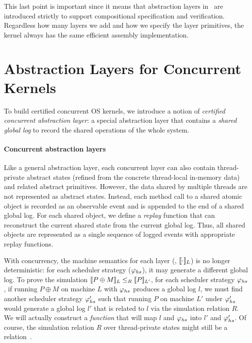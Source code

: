 This last point is important since it means that abstraction
layers in \CTOS\ are introduced strictly to support compositional 
specification and verification. Regardless how many layers we add 
and how we specify the layer primitives, the kernel always has the same 
efficient assembly implementation.

\section{Abstraction Layers for Concurrent Kernels}
\label{sec:overview:concurrent}
To build certified concurrent OS kernels,
we introduce a notion of \emph{certified concurrent abstraction
layer}: a special abstraction layer that 
contains a \emph{shared
global log} to record the shared operations
of the whole system.

\paragraph{Concurrent abstraction layers}
Like a general abstraction layer, each concurrent layer can also
contain thread-private abstract states (refined from the concrete
thread-local in-memory data) and related abstract primitives. However,
the data shared by multiple threads are not represented as abstract
states. Instead, each method call to a shared atomic object is
recorded as an observable event and is appended to the end of a shared
global log. For each shared object, we define a {\em replay} function
that can reconstruct the current shared state from the current global
log. Thus, all shared objects are represented as a single sequence of
logged events with appropriate replay functions.

With concurrency, the machine semantics for each layer (\eg,
$\sem{L}{\cdot}$) is no longer deterministic: for each scheduler
strategy ($\strat{hs}$), it may generate a different global
log. To prove the simulation $\sem{L}{P\oplus{}M} \leq_R \sem{L'}{P}$,
for each scheduler strategy $\strat{hs}$, if running $P\oplus{}M$ on
machine $L$ with $\strat{hs}$ produces a global log $l$, we must find
another scheduler strategy $\stratp{hs}$ such that running $P$ on
machine $L'$ under $\stratp{hs}$ would generate a global log $l'$ that
is related to $l$ via the simulation relation $R$. We will actually
construct a {\em function} that will map $l$ and $\strat{hs}$ into
$l'$ and $\stratp{hs}$. Of course, the simulation relation $R$ over
thread-private states might still be a relation~\cite{dscal15}.

